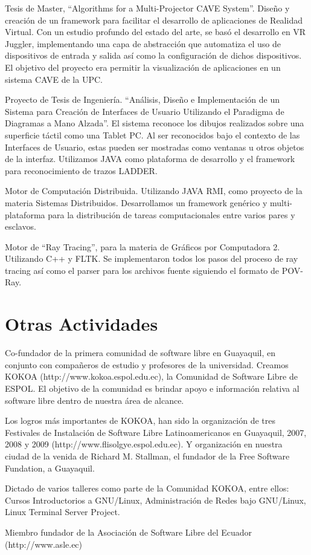 \documentclass[a4paper]{article}
\renewenvironment{itemize}{
  \begin{list}{}{
    \setlength{\leftmargin}{1.5em}
  }
}{
  \end{list}
}
\begin{document}
\begin{itemize}
  \item Tesis de Master, ``Algorithms for a Multi-Projector CAVE System''. Diseño y creación de un framework para facilitar el desarrollo de aplicaciones de Realidad Virtual. Con un estudio profundo del estado del arte, se basó el desarrollo en VR Juggler, implementando una capa de abstracción que automatiza el uso de dispositivos de entrada y salida así como la configuración de dichos dispositivos. El objetivo del proyecto era permitir la visualización de aplicaciones en un sistema CAVE de la UPC.
  \item Proyecto de Tesis de Ingeniería. ``Análisis, Diseño e Implementación de un Sistema para Creación de Interfaces de Usuario Utilizando el Paradigma de Diagramas a Mano Alzada''. El sistema reconoce los dibujos realizados sobre una superficie táctil como una Tablet PC. Al ser reconocidos bajo el contexto de las Interfaces de Usuario, estas pueden ser mostradas como ventanas u otros objetos de la interfaz. Utilizamos JAVA como plataforma de desarrollo y el framework para reconocimiento de trazos LADDER.
  \item Motor de Computación Distribuida. Utilizando JAVA RMI, como proyecto de la materia Sistemas Distribuidos. Desarrollamos un framework genérico y multi-plataforma para la distribución de tareas computacionales entre varios pares y esclavos.
  \item Motor de ``Ray Tracing'', para la materia de Gráficos por Computadora 2. Utilizando C++ y FLTK. Se implementaron todos los pasos del proceso de ray tracing así como el parser para los archivos fuente siguiendo el formato de POV-Ray.
\end{itemize}

\section*{Otras Actividades}

\begin{itemize}
  \item Co-fundador de la primera comunidad de software libre en Guayaquil, en conjunto con compañeros de estudio y profesores de la universidad. Creamos KOKOA (http://www.kokoa.espol.edu.ec), la Comunidad de Software Libre de ESPOL. El objetivo de la comunidad es brindar apoyo e información relativa al software libre dentro de nuestra área de alcance.
  \item Los logros más importantes de KOKOA, han sido la organización de tres Festivales de Instalación de Software Libre Latinoamericanos en Guayaquil, 2007, 2008 y 2009 (http://www.flisolgye.espol.edu.ec). Y organización en nuestra ciudad de la venida de Richard M. Stallman, el fundador de la Free Software Fundation, a Guayaquil.
  \item Dictado de varios talleres como parte de la Comunidad KOKOA, entre ellos: Cursos Introductorios a GNU/Linux, Administración de Redes bajo GNU/Linux, Linux Terminal Server Project.
  \item Miembro fundador de la Asociación de Software Libre del Ecuador (http://www.asle.ec)
\end{itemize}
\end{document}
